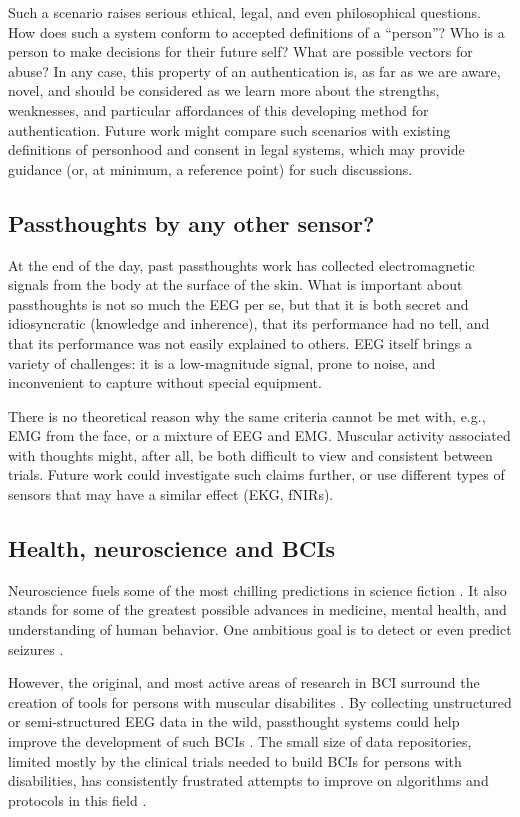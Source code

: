 \documentclass[sigconf]{acmart}
\begin{document}
Such a scenario raises serious ethical, legal, and even philosophical questions.
How does such a system conform to accepted definitions of a ``person''? Who is a
person to make decisions for their future self? What are possible vectors for
abuse? In any case, this property of an authentication is, as far as we are
aware, novel, and should be considered as we learn more about the strengths,
weaknesses, and particular affordances of this developing method for
authentication. Future work might compare such scenarios with existing
definitions of personhood and consent in legal systems, which may provide
guidance (or, at minimum, a reference point) for such discussions.
\subsection{Passthoughts by any other sensor?}
\label{sec:org8f527c9}

At the end of the day, past passthoughts work has collected electromagnetic signals from the body at the surface of the skin.
What is important about passthoughts is not so much the EEG per se, but that it is both secret and idiosyncratic (knowledge and inherence), that its performance had no tell, and that its performance was not easily explained to others.
EEG itself brings a variety of challenges: it is a low-magnitude signal, prone to noise, and inconvenient to capture without special equipment.

There is no theoretical reason why the same criteria cannot be met with, e.g., EMG from the face, or a mixture of EEG and EMG.
Muscular activity associated with thoughts might, after all, be both difficult to view and consistent between trials.
Future work could investigate such claims further, or use different types of sensors that may have a similar effect (EKG, fNIRs).

\subsection{Health, neuroscience and BCIs}
\label{sec:org0ff39f4}

Neuroscience fuels some of the most chilling predictions in science fiction \cite{Welsh2011}.
It also stands for some of the greatest possible advances in medicine, mental health, and understanding of human behavior.
One ambitious goal is to detect or even predict seizures \cite{Mormann2006}.

However, the original, and most active areas of research in BCI surround the creation of tools for persons with muscular disabilites \cite{Carrino2012}.
By collecting unstructured or semi-structured EEG data in the wild, passthought systems could help improve the development of such BCIs \cite{Grierson2011a}.
The small size of data repositories, limited mostly by the clinical trials needed to build BCIs for persons with disabilities,
has consistently frustrated attempts to improve on algorithms and protocols in this field \cite{Allison2009}.
\end{document}
